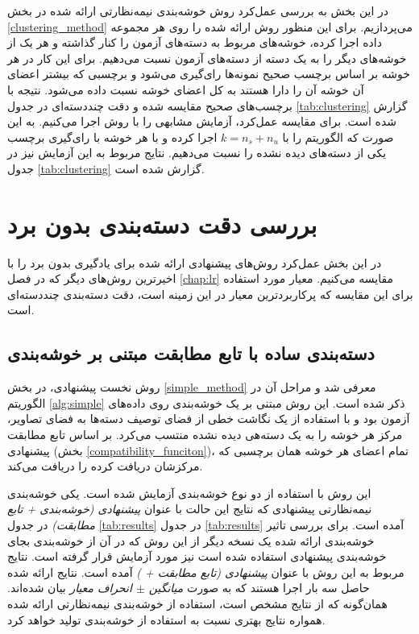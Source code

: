 در این بخش به بررسی عمل‌کرد روش خوشه‌بندی نیمه‌نظارتی ارائه شده در بخش \ref{clustering_method} می‌پردازیم. برای این منظور روش ارائه شده را روی هر مجموعه داده اجرا کرده، خوشه‌های مربوط به دسته‌های آزمون را کنار گذاشته  و هر یک از خوشه‌های دیگر را به یک دسته از دسته‌های آزمون نسبت می‌دهیم. برای این کار در هر خوشه بر اساس برچسب صحیح نمونه‌ها رای‌گیری می‌شود و برچسبی که بیشتر اعضای آن خوشه آن را دارا هستند به کل اعضای خوشه نسبت داده می‌شود. نتیجه با برچسب‌های صحیح مقایسه شده و دقت چنددسته‌ای در جدول \ref{tab:clustering} گزارش شده است.
 برای مقایسه عمل‌کرد، آزمایش مشابهی را با روش  اجرا می‌کنیم. به این صورت که  الگوریتم  را با $k=n_s + n_u$ اجرا کرده و با هر خوشه با رای‌گیری برچسب یکی از دسته‌های دیده نشده را نسبت می‌دهیم. نتایج مربوط به این آزمایش نیز در جدول \ref{tab:clustering} گزارش شده است.

\section{بررسی دقت دسته‌بندی بدون برد}\label{exp:comp}
در این بخش عمل‌کرد روش‌های پیشنهادی ارائه شده برای یادگیری بدون برد را با اخیرترین روش‌های دیگر که در فصل \ref{chap:lr} مقایسه می‌کنیم. معیار مورد استفاده برای این مقایسه که پرکاربردترین معیار در این زمینه است، دقت دسته‌بندی چنددسته‌ای است.
\subsection{دسته‌بندی ساده با تابع مطابقت مبتنی بر خوشه‌بندی}
روش نخست پیشنهادی،  در بخش \ref{simple_method}  معرفی شد و مراحل آن در الگوریتم \ref{alg:simple} ذکر شده است. این روش مبتنی بر یک خوشه‌بندی روی داده‌های آزمون بود و با استفاده از یک نگاشت خطی از فضای توصیف دسته‌ها به فضای تصاویر، مرکز هر خوشه را به یک دسته‌هی دیده نشده منتسب می‌کرد. بر اساس تابع مطابقت پیشنهادی (بخش \ref{compatibility_funciton})، تمام اعضای هر خوشه همان برچسبی که مرکزشان دریافت کرده را دریافت می‌کند.

این روش با استفاده از دو نوع خوشه‌بندی آزمایش شده است. یکی خوشه‌بندی نیمه‌نظارتی پیشنهادی که نتایج این حالت با عنوان 
\textit{پیشنهادی (خوشه‌بندی + تابع مطابقت) }
در جدول \ref{tab:results} در جدول \ref{tab:results} آمده است.
 برای بررسی تاثیر خوشه‌بندی ارائه شده یک نسخه دیگر از این روش که در آن از خوشه‌بندی  بجای خوشه‌بندی پیشنهادی استفاده شده است نیز مورد آزمایش قرار گرفته است. نتایج مربوط به این روش با عنوان
\textit{ پیشنهادی (تابع مطابقت +  ) }
آمده است. نتایج ارائه شده حاصل سه بار اجرا هستند که به صورت
\textit{ میانگین $\pm$ انحراف معیار }
بیان شده‌اند. همان‌گونه که از نتایج مشخص است، استفاده از خوشه‌بندی نیمه‌نظارتی ارائه شده همواره نتایج بهتری نسبت به استفاده از خوشه‌بندی   تولید خواهد کرد.
